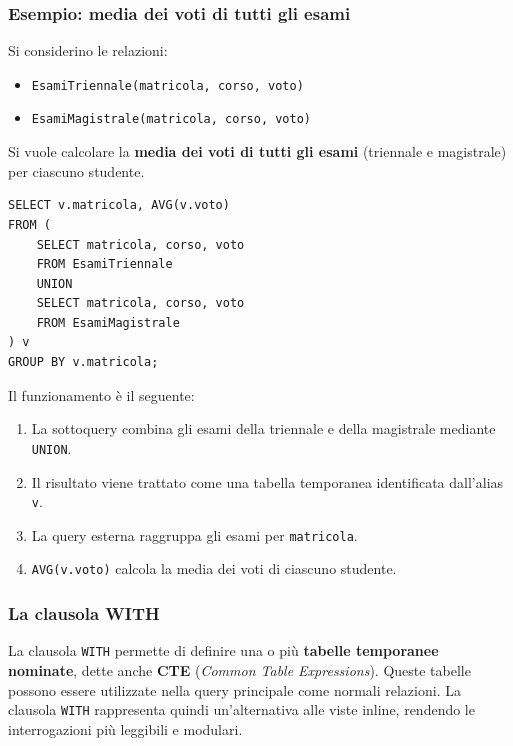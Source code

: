 \subsubsection*{Esempio: media dei voti di tutti gli esami}
Si considerino le relazioni:
\begin{itemize}
    \item \texttt{EsamiTriennale(matricola, corso, voto)}
    \item \texttt{EsamiMagistrale(matricola, corso, voto)}
\end{itemize}
Si vuole calcolare la \textbf{media dei voti di tutti gli esami}
(triennale e magistrale) per ciascuno studente.
\begin{verbatim}
SELECT v.matricola, AVG(v.voto)
FROM (
    SELECT matricola, corso, voto
    FROM EsamiTriennale
    UNION
    SELECT matricola, corso, voto
    FROM EsamiMagistrale
) v
GROUP BY v.matricola;
\end{verbatim}
Il funzionamento è il seguente:
\begin{enumerate}
    \item La sottoquery combina gli esami della triennale
    e della magistrale mediante \texttt{UNION}.
    
    \item Il risultato viene trattato come una tabella
    temporanea identificata dall'alias \texttt{v}.
    
    \item La query esterna raggruppa gli esami per
    \texttt{matricola}.
    
    \item \texttt{AVG(v.voto)} calcola la media dei voti
    di ciascuno studente.
\end{enumerate}
\subsubsection{La clausola WITH}
La clausola \texttt{WITH} permette di definire una o più
\textbf{tabelle temporanee nominate}, dette anche
\textbf{CTE} (\textit{Common Table Expressions}).
Queste tabelle possono essere utilizzate nella query
principale come normali relazioni.
La clausola \texttt{WITH} rappresenta quindi un'alternativa
alle viste inline, rendendo le interrogazioni più leggibili
e modulari.
